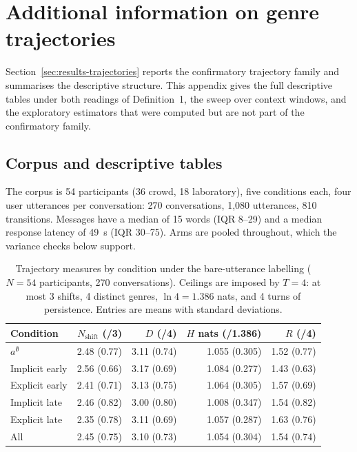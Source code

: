 \section{Additional information on genre trajectories}
\label{sec:app-trajectories}

Section~\ref{sec:results-trajectories} reports the confirmatory trajectory family and summarises the descriptive structure. This appendix gives the full descriptive tables under both readings of Definition~1, the sweep over context windows, and the exploratory estimators that were computed but are not part of the confirmatory family.

\subsection{Corpus and descriptive tables}
\label{sec:app-traj-descriptives}

The corpus is 54 participants (36 crowd, 18 laboratory), five conditions each, four user utterances per conversation: 270 conversations, 1{,}080 utterances, 810 transitions. Messages have a median of 15 words (IQR 8--29) and a median response latency of 49~s (IQR 30--75). Arms are pooled throughout, which the variance checks below support.

\begin{table}[H]
\centering
\caption{Trajectory measures by condition under the bare-utterance labelling (\(N=54\) participants, 270 conversations). Ceilings are imposed by \(T=4\): at most 3 shifts, 4 distinct genres, \(\ln 4 = 1.386\) nats, and 4 turns of persistence. Entries are means with standard deviations.}
\label{tab:app-traj-measures}
\begin{tabular}{lrrrr}
\toprule
Condition & \(N_{\mathrm{shift}}\) (/3) & \(D\) (/4) & \(H\) nats (/1.386) & \(R\) (/4) \\
\midrule
\(a^{\emptyset}\)   & 2.48 (0.77) & 3.11 (0.74) & 1.055 (0.305) & 1.52 (0.77) \\
Implicit early      & 2.56 (0.66) & 3.17 (0.69) & 1.084 (0.277) & 1.43 (0.63) \\
Explicit early      & 2.41 (0.71) & 3.13 (0.75) & 1.064 (0.305) & 1.57 (0.69) \\
Implicit late       & 2.46 (0.82) & 3.00 (0.80) & 1.008 (0.347) & 1.54 (0.82) \\
Explicit late       & 2.35 (0.78) & 3.11 (0.69) & 1.057 (0.287) & 1.63 (0.76) \\
\midrule
All                 & 2.45 (0.75) & 3.10 (0.73) & 1.054 (0.304) & 1.54 (0.74) \\
\bottomrule
\end{tabular}
\end{table}

